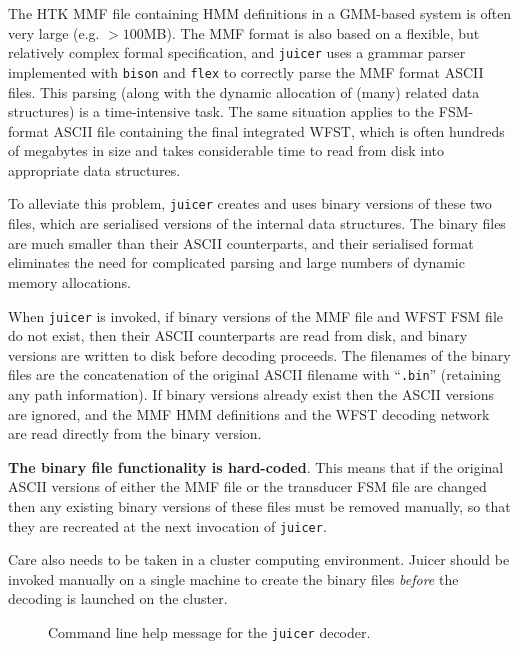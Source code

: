 \documentclass[a4paper,12pt]{report}
\begin{document}
The HTK MMF file containing HMM definitions in a GMM-based system is often very large (e.g. $>100$MB). The MMF format is also based on a flexible, but relatively complex formal specification, and {\tt juicer} uses a grammar  parser implemented with {\tt bison} and {\tt flex} to correctly parse the MMF format ASCII files. This parsing (along with the dynamic allocation of (many) related data structures) is a time-intensive task. The same situation applies to the FSM-format ASCII file containing the final integrated WFST, which is often hundreds of megabytes in size and takes considerable time to read from disk into appropriate data structures.

To alleviate this problem, {\tt juicer} creates and uses binary versions of these two files, which are serialised versions of the internal data structures. The binary files are much smaller than their ASCII counterparts, and their serialised format eliminates the need for complicated parsing and large numbers of dynamic memory allocations.

When {\tt juicer} is invoked, if binary versions of the MMF file and WFST FSM file do not exist, then their ASCII counterparts are read from disk, and binary versions are written to disk before decoding proceeds. The filenames of the binary files are the concatenation of the original ASCII filename with ``{\tt .bin}'' (retaining any path information). If binary versions already exist then the ASCII versions are ignored, and the MMF HMM definitions and the WFST decoding network are read directly from the binary version. 

{\bf The binary file functionality is hard-coded}. This means that if the original ASCII versions of either the MMF file or the transducer FSM file are changed then any existing binary versions of these files must be removed manually, so that they are recreated at the next invocation of {\tt juicer}.

Care also needs to be taken in a cluster computing environment. Juicer should be invoked manually on a single machine to create the binary files \emph{before} the decoding is launched on the cluster.


\begin{figure}
\begin{center}
\caption{Command line help message for the {\tt juicer} decoder.}
\label{fig:juicer_help}
\end{center}
\end{figure}
\end{document}
